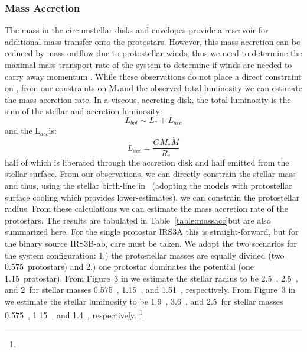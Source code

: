 \documentclass[twocolumn, 12pt, trackchanges]{aastex63}
\begin{document}
\subsubsection{Mass Accretion}\label{sec:massacc}
The mass in the circumstellar disks and envelopes provide a reservoir for additional mass transfer onto the protostars. However, this mass accretion can be reduced by mass outflow due to protostellar winds, thus we need to determine the maximal mass transport rate of the system to determine if winds are needed to carry away momentum \citep{1998ApJ...502..661W}. While these observations do not place a direct constraint on \mdot, from our constraints on M$_{*}$\space and the observed total luminosity we can estimate the mass accretion rate. In a viscous, accreting disk, the total luminosity is the sum of the stellar and accretion luminosity:
\begin{equation}
L_{bol}\sim L_{*}+L_{acc}
\end{equation}
and the L$_{acc}$\space is:
\begin{equation}
L_{acc}=\frac{GM_{*}\dot{M}}{R_{*}}
\end{equation}
half of which is liberated through the accretion disk and half emitted from the stellar surface. From our observations, we can directly constrain the stellar mass and thus, using the stellar birth-line in \citet{1997ApJ...475..770H}~(adopting the models with protostellar surface cooling which provides lower-estimates), we can constrain the protostellar radius. From these calculations we can estimate the mass accretion rate of the protostars. The results are tabulated in Table~\ref{table:massacc}\space but are also summarized here. For the single protostar IRS3A this is straight-forward, but for the binary source IRS3B-ab, care must be taken. We adopt the two scenarios for the system configuration: 1.) the protostellar masses are equally divided (two 0.575~\solm\space protostars) and 2.) one protostar dominates the potential (one 1.15~\solm\space protostar). From Figure~3 in \citet{1997ApJ...475..770H}\space we estimate the stellar radius to be 2.5~\rsun, 2.5~\rsun, and 2~\rsun\space for stellar masses 0.575~\solm, 1.15~\solm, and 1.51~\solm, respectively. From Figure~3 in \citet{1997ApJ...475..770H}\space we estimate the stellar luminosity to be 1.9~\lsun, 3.6~\lsun, and 2.5~\lsun\space for stellar masses 0.575~\solm, 1.15~\solm, and 1.4~\solm, respectively. \footnote{}
\end{document}
